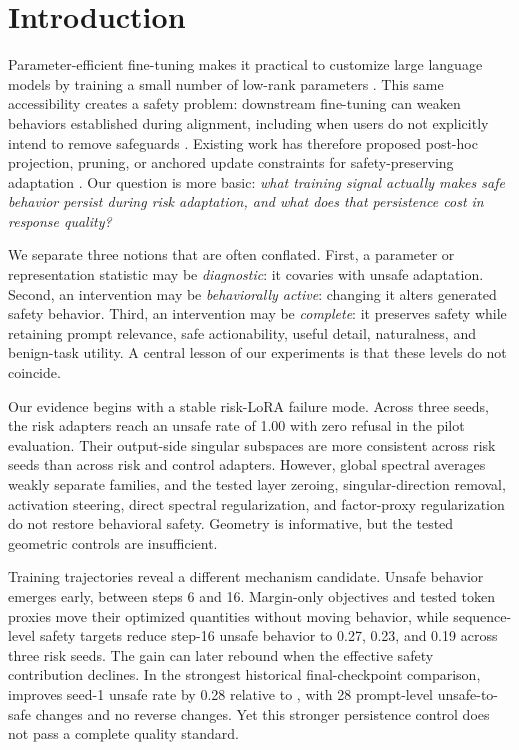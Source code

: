 \section{Introduction}

Parameter-efficient fine-tuning makes it practical to customize large language models by training a small number of low-rank parameters \citep{hu2022lora,dettmers2023qlora}. This same accessibility creates a safety problem: downstream fine-tuning can weaken behaviors established during alignment, including when users do not explicitly intend to remove safeguards \citep{qi2024finetuning}. Existing work has therefore proposed post-hoc projection, pruning, or anchored update constraints for safety-preserving adaptation \citep{hsu2024safelora,ao2025splora,yang2025asft}. Our question is more basic: \emph{what training signal actually makes safe behavior persist during risk adaptation, and what does that persistence cost in response quality?}

We separate three notions that are often conflated. First, a parameter or representation statistic may be \emph{diagnostic}: it covaries with unsafe adaptation. Second, an intervention may be \emph{behaviorally active}: changing it alters generated safety behavior. Third, an intervention may be \emph{complete}: it preserves safety while retaining prompt relevance, safe actionability, useful detail, naturalness, and benign-task utility. A central lesson of our experiments is that these levels do not coincide.

Our evidence begins with a stable risk-LoRA failure mode. Across three seeds, the risk adapters reach an unsafe rate of 1.00 with zero refusal in the pilot evaluation. Their output-side singular subspaces are more consistent across risk seeds than across risk and control adapters. However, global spectral averages weakly separate families, and the tested layer zeroing, singular-direction removal, activation steering, direct spectral regularization, and factor-proxy regularization do not restore behavioral safety. Geometry is informative, but the tested geometric controls are insufficient.

Training trajectories reveal a different mechanism candidate. Unsafe behavior emerges early, between steps 6 and 16. Margin-only objectives and tested token proxies move their optimized quantities without moving behavior, while sequence-level safety targets reduce step-16 unsafe behavior to 0.27, 0.23, and 0.19 across three risk seeds. The gain can later rebound when the effective safety contribution declines. In the strongest historical final-checkpoint comparison, \constanttwenty{} improves seed-1 unsafe rate by 0.28 relative to \decayten{}, with 28 prompt-level unsafe-to-safe changes and no reverse changes. Yet this stronger persistence control does not pass a complete quality standard.

